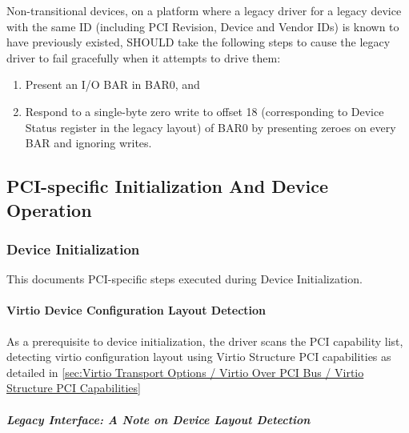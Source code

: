 Non-transitional devices, on a platform where a legacy driver for
a legacy device with the same ID (including PCI Revision, Device
and Vendor IDs) is known to have previously existed,
SHOULD take the following steps to cause the legacy driver to
fail gracefully when it attempts to drive them:

\begin{enumerate}
\item Present an I/O BAR in BAR0, and
\item Respond to a single-byte zero write to offset 18
   (corresponding to Device Status register in the legacy layout)
   of BAR0 by presenting zeroes on every BAR and ignoring writes.
\end{enumerate}

\subsection{PCI-specific Initialization And Device Operation}\label{sec:Virtio Transport Options / Virtio Over PCI Bus / PCI-specific Initialization And Device Operation}

\subsubsection{Device Initialization}\label{sec:Virtio Transport Options / Virtio Over PCI Bus / PCI-specific Initialization And Device Operation / Device Initialization}

This documents PCI-specific steps executed during Device Initialization.

\paragraph{Virtio Device Configuration Layout Detection}\label{sec:Virtio Transport Options / Virtio Over PCI Bus / PCI-specific Initialization And Device Operation / Device Initialization / Virtio Device Configuration Layout Detection}

As a prerequisite to device initialization, the driver scans the
PCI capability list, detecting virtio configuration layout using Virtio
Structure PCI capabilities as detailed in \ref{sec:Virtio Transport Options / Virtio Over PCI Bus / Virtio Structure PCI Capabilities}

\subparagraph{Legacy Interface: A Note on Device Layout Detection}\label{sec:Virtio Transport Options / Virtio Over PCI Bus / PCI-specific Initialization And Device Operation / Device Initialization / Virtio Device Configuration Layout Detection / Legacy Interface: A Note on Device Layout Detection}

